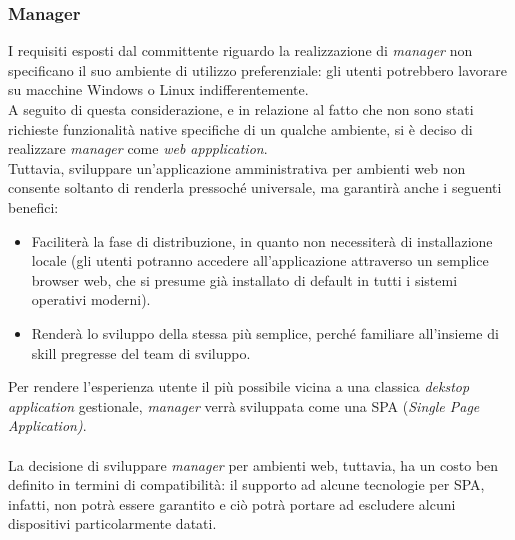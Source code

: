 \documentclass[12pt]{article}
\begin{document}
\subsubsection{Manager}
I requisiti esposti dal committente riguardo la realizzazione di \textit{manager} non specificano il suo ambiente di utilizzo preferenziale: gli utenti potrebbero lavorare su macchine Windows o Linux indifferentemente.\\
A seguito di questa considerazione, e in relazione al fatto che non sono stati richieste funzionalità native specifiche di un qualche ambiente, si è deciso di realizzare \textit{manager} come \textit{web appplication}.\\
Tuttavia, sviluppare un'applicazione amministrativa per ambienti web  non consente soltanto di renderla pressoché universale, ma garantirà anche i seguenti benefici:
\begin{itemize}
\item Faciliterà la fase di distribuzione, in quanto non necessiterà di installazione locale (gli utenti potranno accedere all'applicazione attraverso un semplice browser web, che si presume già installato di default in tutti i sistemi operativi moderni).
 \item Renderà lo sviluppo della stessa più semplice, perché familiare all'insieme di skill pregresse del team di sviluppo.
\end{itemize}
Per rendere l'esperienza utente il più possibile vicina a una classica \textit{dekstop application} gestionale, \textit{manager} verrà sviluppata come una SPA (\textit{Single Page Application)}.\\\\
La decisione di sviluppare \textit{manager} per ambienti web, tuttavia, ha un costo ben definito in termini di compatibilità: il supporto ad alcune tecnologie per SPA, infatti, non potrà essere garantito  e ciò potrà portare ad escludere alcuni dispositivi particolarmente datati.\\
\end{document}
